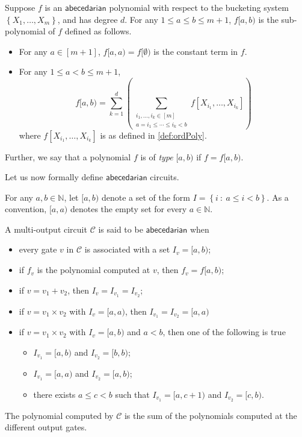\documentclass[10pt,a4paper]{article}
\def\Natural{\mathbb{N}}
\let\N\Natural
\def\set#1{\left\{ #1 \right\}}
\def\inparen#1{\left( #1 \right)}
\def\inbrace#1{\left\{ #1 \right\}}
\def\setdef#1#2{\inbrace{ #1 \ : \ #2}}
\newcommand{\ckt}{\textbf{$\mathcal{C}$}}
\newcommand{\abcd}{\mathsf{abecedarian}}
\begin{document}
\begin{definition}\label{def:subPoly-of-OrdPoly}
	Suppose $f$ is an $\abcd$ polynomial with respect to the bucketing system $\set{X_1, \ldots, X_m}$, and has degree $d$. For any $1 \leq a \leq b \leq m+1$, $f[a,b)$ is the sub-polynomial of $f$ defined as follows.
	\begin{itemize}
		\item For any $a \in [m+1]$, $f[a, a) = f[\emptyset)$ is the constant term in $f$.
		\item For any $1 \leq a < b \leq m+1$,
		\[
			f[a,b) = \sum_{k=1}^{d} \inparen{\sum_{\substack{i_1, \ldots, i_k \in [m] \\ a = i_1 \leq \cdots \leq i_k < b}} f[X_{i_1}, \ldots, X_{i_k}]}	
		\]
		where $f[X_{i_1}, \ldots, X_{i_k}]$ is as defined in \autoref{def:ordPoly}.
	\end{itemize}
	Further, we say that a polynomial $f$ is of \emph{type} $[a,b)$ if $f = f[a,b)$.
\end{definition}

\noindent Let us now formally define $\abcd$ circuits.
%
%

\begin{definition}\label{def:ordCkt}
	For any $a, b \in \N$, let $[a,b)$ denote a set of the form $I = \setdef{i}{a \leq i < b}$. 
	As a convention, $[a,a)$ denotes the empty set for every $a \in \N$. 
	
	A multi-output circuit $\ckt$ is said to be $\abcd$ when
	\begin{itemize}
		\item every gate $v$ in $\ckt$ is associated with a set $I_v = [a,b)$;
		\item if $f_v$ is the polynomial computed at $v$, then $f_v = f[a, b)$;
		\item if $v = v_1 + v_2$, then $I_v = I_{v_1} = I_{v_2}$;
		\item if $v = v_1 \times v_2$ with $I_v = [a, a)$, then $I_{v_1} = I_{v_2} = [a,a)$
		\item  if $v = v_1 \times v_2$ with $I_v = [a, b)$ and $a < b$, then one of the following is true
		\begin{itemize}
			\item $I_{v_1} = [a,b)$ and $I_{v_2} = [b,b)$;
			\item $I_{v_1} = [a,a)$ and $I_{v_2} = [a,b)$;
			\item there exists $a \leq c < b$ such that $I_{v_1} = [a, c+1)$ and $I_{v_2} = [c, b)$.
		\end{itemize} 
	\end{itemize}
	The polynomial computed by $\ckt$ is the sum of the polynomials computed at the different output gates.
\end{definition}
\end{document}
